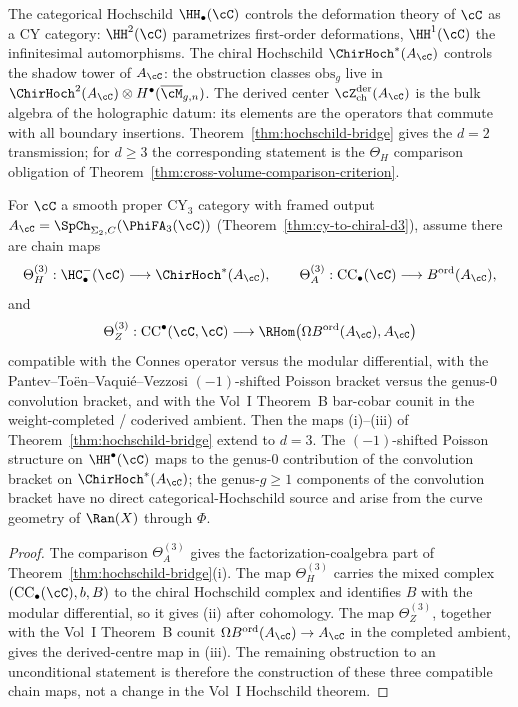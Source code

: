 \begin{remark}
\label{rem:hochschild-controls}
The categorical Hochschild $\HH_\bullet(\cC)$ controls the deformation
theory of $\cC$ as a CY category: $\HH^2(\cC)$ parametrizes first-order
deformations, $\HH^1(\cC)$ the infinitesimal automorphisms. The chiral
Hochschild $\ChirHoch^*(A_\cC)$ controls the shadow tower of $A_\cC$:
the obstruction classes $\mathrm{obs}_g$ live in
$\ChirHoch^2(A_\cC) \otimes H^\bullet(\overline{\cM}_{g,n})$. The
derived center $\cZ^{\mathrm{der}}_{\mathrm{ch}}(A_\cC)$ is the bulk
algebra of the holographic datum: its elements are the operators that
commute with all boundary insertions. Theorem~\ref{thm:hochschild-bridge}
gives the $d=2$ transmission; for $d\geq3$ the corresponding statement is
the $\Theta_H$ comparison obligation of
Theorem~\ref{thm:cross-volume-comparison-criterion}.
\end{remark}

\begin{theorem}[Hochschild bridge at \texorpdfstring{$d = 3$}{d = 3} through \texorpdfstring{$\Theta_H$}{Theta-H}]
\label{conj:hochschild-bridge-d3}
For $\cC$ a smooth proper CY$_3$ category with framed output
$A_\cC = \SpCh_{\Sigma_2,C}(\PhiFA_3(\cC))$ (Theorem~\ref{thm:cy-to-chiral-d3}), assume there are chain maps
\[
\Theta_H^{(3)}:\HC^-_\bullet(\cC)\longrightarrow \ChirHoch^*(A_\cC),
\qquad
\Theta_A^{(3)}:\mathrm{CC}_\bullet(\cC)\longrightarrow B^{\mathrm{ord}}(A_\cC),
\]
and
\[
\Theta_Z^{(3)}:\mathrm{CC}^\bullet(\cC,\cC)\longrightarrow
\RHom\!\left(\Omega B^{\mathrm{ord}}(A_\cC),A_\cC\right)
\]
compatible with the Connes operator versus the modular differential, with
the Pantev--To\"en--Vaqui\'e--Vezzosi $(-1)$-shifted Poisson bracket
versus the genus-$0$ convolution bracket, and with the Vol~I Theorem~B
bar-cobar counit in the weight-completed / coderived ambient. Then the
maps (i)--(iii) of Theorem~\ref{thm:hochschild-bridge} extend to $d = 3$.
The $(-1)$-shifted Poisson structure on $\HH^\bullet(\cC)$ maps to the
genus-$0$ contribution of the convolution bracket on
$\ChirHoch^*(A_\cC)$; the genus-$g \geq 1$ components of the convolution
bracket have no direct categorical-Hochschild source and arise from the
curve geometry of $\Ran(X)$ through $\Phi$.
\end{theorem}

\begin{proof}
The comparison $\Theta_A^{(3)}$ gives the factorization-coalgebra part of
Theorem~\ref{thm:hochschild-bridge}(i). The map $\Theta_H^{(3)}$ carries
the mixed complex $(\mathrm{CC}_\bullet(\cC),b,B)$ to the chiral
Hochschild complex and identifies $B$ with the modular differential, so it
gives (ii) after cohomology. The map $\Theta_Z^{(3)}$, together with the
Vol~I Theorem~B counit $\Omega B^{\mathrm{ord}}(A_\cC)\to A_\cC$ in the
completed ambient, gives the derived-centre map in (iii). The remaining
obstruction to an unconditional statement is therefore the construction of
these three compatible chain maps, not a change in the Vol~I Hochschild
theorem.
\end{proof}



